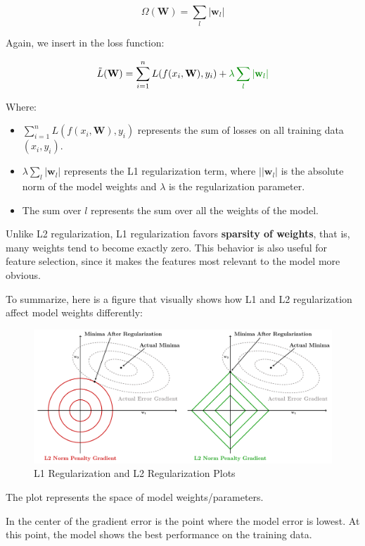 $$
\Omega(\mathbf{W}) = \sum_{l} |\mathbf{w}_l|
$$

Again, we insert in the loss function:

$$
\tilde{L}(\mathbf{W}) = \sum_{i=1}^{n} L(f(x_i, \mathbf{W}), y_i) + \textcolor{mygreen!90!black}{\lambda \sum_{l} |\mathbf{w}_l|}
$$

Where:
\begin{itemize}
    \item $\sum_{i=1}^{n} L(f(x_i, \mathbf{W}), y_i)$ represents the sum of losses on all training data $(x_i, y_i)$.
    \item $\lambda \sum_{l} |\mathbf{w}_l|$ represents the L1 regularization term, where $||\mathbf{w}_l|$ is the absolute norm of the model weights and $\lambda$ is the regularization parameter.
    \item The sum over $l$ represents the sum over all the weights of the model.
\end{itemize}

Unlike L2 regularization, L1 regularization favors \textbf{sparsity of weights}, that is, many weights tend to become exactly zero. This behavior is also useful for feature selection, since it makes the features most relevant to the model more obvious.

To summarize, here is a figure that visually shows how L1 and L2 regularization affect model weights differently:

\begin{figure}[!htbp]
    \centering
    \includegraphics[width = \linewidth]{tikz/chapter4 - L1 and L2 plot.pdf}
    \caption{L1 Regularization and L2 Regularization Plots}
\end{figure}


The plot represents the space of model weights/parameters.

In the center of the gradient error is the point where the model error is lowest. At this point, the model shows the best performance on the training data.


